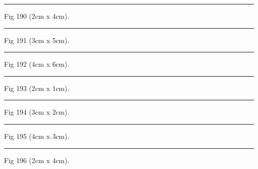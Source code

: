 \documentclass[a4paper,11pt]{article}
\begin{document}
\begin{swarmwrap}%
  \begin{minipage}[t]{2cm}
    \centering
    \rule{\linewidth}{4cm}
    {\footnotesize Fig 190 (2cm x 4cm).}
  \end{minipage}%
\end{swarmwrap}%
\swarmwrapnext
\lipsum[40]%

\begin{swarmwrap}%
  \begin{minipage}[t]{3cm}
    \centering
    \rule{\linewidth}{5cm}
    {\footnotesize Fig 191 (3cm x 5cm).}
  \end{minipage}%
\end{swarmwrap}%
\swarmwrapnext
\lipsum[41]%

\begin{swarmwrap}%
  \begin{minipage}[t]{4cm}
    \centering
    \rule{\linewidth}{6cm}
    {\footnotesize Fig 192 (4cm x 6cm).}
  \end{minipage}%
\end{swarmwrap}%
\swarmwrapnext
\lipsum[42]%

\begin{swarmwrap}%
  \begin{minipage}[t]{2cm}
    \centering
    \rule{\linewidth}{1cm}
    {\footnotesize Fig 193 (2cm x 1cm).}
  \end{minipage}%
\end{swarmwrap}%
\swarmwrapnext
\lipsum[43]%

\begin{swarmwrap}%
  \begin{minipage}[t]{3cm}
    \centering
    \rule{\linewidth}{2cm}
    {\footnotesize Fig 194 (3cm x 2cm).}
  \end{minipage}%
\end{swarmwrap}%
\swarmwrapnext
\lipsum[44]%

\begin{swarmwrap}%
  \begin{minipage}[t]{4cm}
    \centering
    \rule{\linewidth}{3cm}
    {\footnotesize Fig 195 (4cm x 3cm).}
  \end{minipage}%
\end{swarmwrap}%
\swarmwrapnext
\lipsum[45]%

\begin{swarmwrap}%
  \begin{minipage}[t]{2cm}
    \centering
    \rule{\linewidth}{4cm}
    {\footnotesize Fig 196 (2cm x 4cm).}
  \end{minipage}%
\end{swarmwrap}%
\swarmwrapnext
\lipsum[46]%
\end{document}
